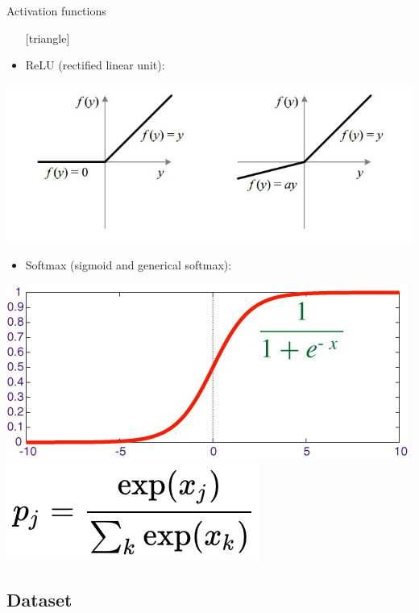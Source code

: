 \documentclass{beamer}
\begin{document}
\begin{frame}{Activation functions}
	\begin{itemize}
		\setlength\itemsep{1em}
		[triangle]
		\item 
			ReLU (rectified linear unit):
	\end{itemize}
	\begin{center}
		\includegraphics[scale=0.30]{ReLU}
	\end{center}
	\begin{itemize}
		\setlength\itemsep{1em}
		[triangle]
		\item 
			Softmax (sigmoid and generical softmax):
	\end{itemize}
	\begin{center}
		\includegraphics[scale=0.25]{softmax1}
		\includegraphics[scale=0.6]{softm}
	\end{center}
\end{frame}

\subsection{Dataset}
\end{document}
